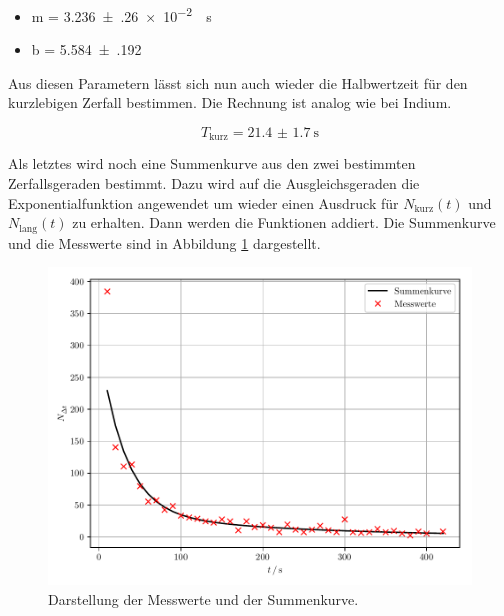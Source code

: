 \begin{itemize}
  \item m = \SI{3.236(260)e-2}{\per\second}
  \item b = \num{5.584(192)}
\end{itemize}

Aus diesen Parametern lässt sich nun auch wieder die Halbwertzeit für den kurzlebigen
Zerfall bestimmen. Die Rechnung ist analog wie bei Indium.

\begin{equation*}
  T_\text{kurz} = \SI{21.4(17)}{\second}
\end{equation*}

Als letztes wird noch eine Summenkurve aus den zwei bestimmten Zerfallsgeraden bestimmt.
Dazu wird auf die Ausgleichsgeraden die Exponentialfunktion angewendet um wieder einen
Ausdruck für $N_\text{kurz}(t)$ und $N_\text{lang}(t)$ zu erhalten. Dann werden die
Funktionen addiert. Die Summenkurve und die Messwerte sind in Abbildung \ref{abb:5}
dargestellt.

\begin{figure}[H]
  \centering
  \includegraphics{plot2.pdf}
  \caption{Darstellung der Messwerte und der Summenkurve.}
  \label{abb:5}
\end{figure}
